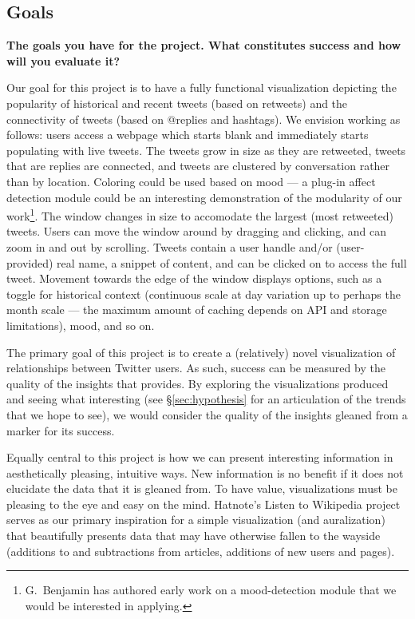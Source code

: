 \subsection{Goals}
\textbf{The goals you have for the project. What constitutes success and how will you evaluate it?}

Our goal for this project is to have a fully functional visualization depicting the popularity of historical and recent
tweets (based on retweets) and the connectivity of tweets (based on @replies and hashtags). 
We envision \sys working as follows: users access a webpage which starts blank and immediately starts populating with
live tweets. The tweets grow in size as they are retweeted, tweets that are replies are connected, and tweets are 
clustered by conversation rather than by location. Coloring could be used based on mood --- a plug-in affect detection
module could be an interesting demonstration of the modularity of our work\footnote{G.\ Benjamin has authored early work on
a mood-detection module that we would be interested in applying.}. The window changes in size to accomodate the
largest (most retweeted) tweets. Users can move the window around by dragging and clicking, and can zoom in and out
by scrolling. Tweets contain a user handle and/or (user-provided) real name, a snippet of content, and can be clicked on
to access the full tweet. Movement towards the edge of the window displays options, such as a toggle for historical 
context (continuous scale at day variation up to perhaps the month scale --- the maximum amount of caching depends on 
API and storage limitations), mood, and so on.

The primary goal of this project is to create a (relatively) novel visualization of relationships between Twitter users.
As such, success can be measured by the quality of the insights that \sys provides. By exploring the visualizations 
produced and seeing what interesting (see \S \ref{sec:hypothesis} for an articulation of the trends that we hope to see),
we would consider the quality of the insights gleaned from \sys a marker for its success.

Equally central to this project is how we can present interesting information in aesthetically pleasing, intuitive ways.
New information is no benefit if it does not elucidate the data that it is gleaned from. To have value, visualizations
must be pleasing to the eye and easy on the mind. Hatnote's Listen to Wikipedia project~\cite{listenwiki} serves as our
primary inspiration for a simple visualization (and auralization) that beautifully presents data that may have otherwise
fallen to the wayside (additions to and subtractions from articles, additions of new users and pages). 


